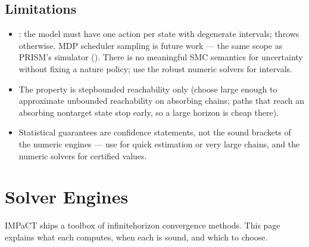 \documentclass[a4paper,10pt,english]{sphinxmanual}
\begin{document}
\subsection{Limitations}
\label{\detokenize{manual/smc:limitations}}\begin{itemize}
\item {} 
\sphinxAtStartPar
{}: the model must have one action per state with degenerate
intervals;  throws otherwise. MDP scheduler sampling is future work — the same
scope as PRISM’s simulator (). There is no meaningful SMC semantics for
 uncertainty without fixing a nature policy; use the robust numeric
solvers for intervals.

\item {} 
\sphinxAtStartPar
The property is step\sphinxhyphen{}bounded reachability only (choose  large enough to
approximate unbounded reachability on absorbing chains; paths that reach an
absorbing non\sphinxhyphen{}target state stop early, so a large horizon is cheap there).

\item {} 
\sphinxAtStartPar
Statistical guarantees are confidence statements, not the sound 
brackets of the numeric engines — use  for quick estimation or very large
chains, and the numeric solvers for certified values.

\end{itemize}

\sphinxstepscope


\section{Solver Engines}
\label{\detokenize{manual/engines:solver-engines}}\label{\detokenize{manual/engines::doc}}
\sphinxAtStartPar
IMPaCT ships a toolbox of infinite\sphinxhyphen{}horizon convergence methods. This page explains
what each computes, when each is sound, and which to choose.
\end{document}
